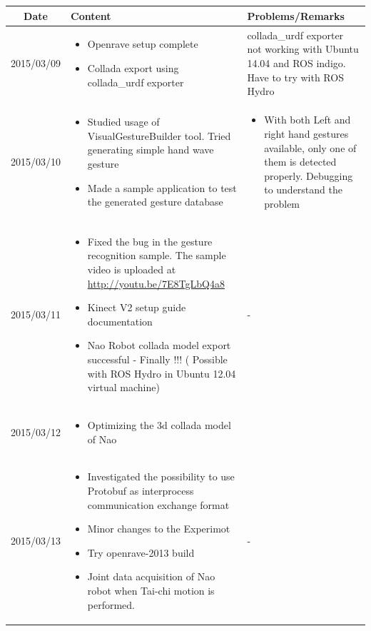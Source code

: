 \documentclass[11pt]{article} %
\begin{document}
\begin{center}
    \begin{longtable}{ | c | p{6cm} | p{5cm} |}
    \hline
    Date & Content & Problems/Remarks \\ 
    \endhead
    \hline    
     2015/03/09         & 
  \begin{itemize}
  \item Openrave setup complete
  \item Collada export using collada\_urdf exporter
\end{itemize}  
   & collada\_urdf exporter not working with Ubuntu 14.04 and ROS indigo. Have to try with ROS Hydro \\
\hline
  										 
 2015/03/10         & 
  \begin{itemize}
  \item Studied usage of VisualGestureBuilder tool. Tried generating simple hand wave gesture
  \item Made a sample application to test the generated gesture database
\end{itemize}   
& 
  \begin{itemize}
  \item With both Left and right hand gestures available, only one of them is detected properly. Debugging to understand the problem
\end{itemize}  \\
\hline
  										 
  
  2015/03/11        & 
  \begin{itemize}
  \item Fixed the bug in the gesture recognition sample. The sample video is uploaded at \url{http://youtu.be/7E8TgLbQ4a8}
  \item Kinect V2 setup guide documentation
  \item Nao Robot collada model export successful - Finally !!! ( Possible with ROS Hydro in Ubuntu 12.04 virtual machine)
\end{itemize}   
  										 & - \\
  \hline
  
  2015/03/12         & 
  \begin{itemize}
  \item Optimizing the 3d collada model of Nao
\end{itemize}   
  & 
\\  										 \hline

  2015/03/13         & 
  \begin{itemize}
  \item Investigated the possibility to use Protobuf as interprocess communication exchange format
  \item Minor changes to the Experimot
  \item Try openrave-2013 build
  \item Joint data acquisition of Nao robot when Tai-chi motion is performed.
\end{itemize}   
  & 
- \\
  										 \hline
  										 

\end{longtable}
\end{center}
\end{document}
